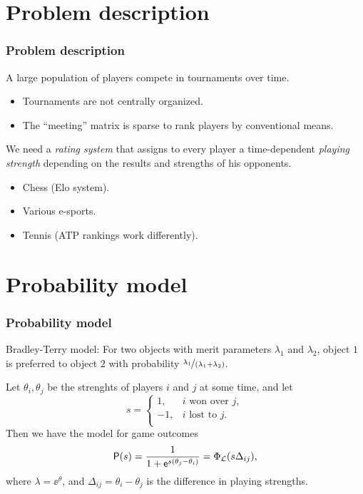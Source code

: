 \documentclass[color={usenames,dvipsnames}]{beamer}
\title{\mytitle}
\author[{E}. {F}onn]{Eivind Fonn}
\institute{SINTEF ICT}
\date{May 21, 2015}
\begin{document}
\begin{frame}
  \titlepage
\end{frame}

\section{Problem description}

\begin{frame}
  \frametitle{Problem description}
  
  A large population of players compete in tournaments over time.
  \begin{itemize}
    \item Tournaments are not centrally organized.
    \item The ``meeting'' matrix is sparse to rank players by conventional
      means.
  \end{itemize}

  We need a {\em rating system} that assigns to every player a time-dependent
  {\em playing strength} depending on the results and strengths of his opponents.

  \begin{itemize}
    \item Chess (Elo system).
    \item Various e-sports.
    \item Tennis (ATP rankings work differently).
  \end{itemize}
\end{frame}

\section{Probability model}

\begin{frame}
  \frametitle{Probability model}

  Bradley-Terry model: For two objects with merit parameters $\lambda_1$ and
  $\lambda_2$, object $1$ is preferred to object $2$ with probability
  $\nicefrac{\lambda_1}{(\lambda_1+\lambda_2)}$.

  \vspace{0.3cm}

  Let $\theta_i, \theta_j$ be the strenghts of players $i$ and $j$ at some time,
  and let
  \[
    s =
    \begin{cases}
      1, & \text{$i$ won over $j$}, \\
      -1, & \text{$i$ lost to $j$}. \\
    \end{cases}
  \]
  Then we have the model for game outcomes
  \[
    \mathsf{P}(s) = \frac{1}{1 + \mathsf{e}^{s(\theta_j - \theta_i)}} = \Phi_{\mathcal{L}}(s\Delta_{ij}),
  \]
  where $\lambda = \ee^{\theta}$, and $\Delta_{ij} = \theta_i - \theta_j$ is the
  difference in playing strengths.
\end{frame}
\end{document}
